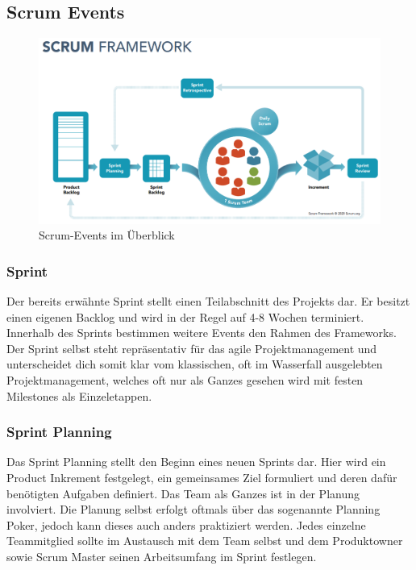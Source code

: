 \subsection{Scrum Events}
\begin{figure}[!htb]
  \centering
  \includegraphics[width=1\textwidth]{figures/daniel/Bild-2.png}
  \caption[]{Scrum-Events im Überblick}
  \label{fig:scrum_events}
\end{figure}

\subsubsection{Sprint}
Der bereits erwähnte Sprint stellt einen Teilabschnitt des Projekts dar. Er besitzt einen eigenen Backlog und wird in der Regel auf 4-8 Wochen terminiert. Innerhalb des Sprints bestimmen weitere Events den Rahmen des Frameworks. Der Sprint selbst steht repräsentativ für das agile Projektmanagement und unterscheidet dich somit klar vom klassischen, oft im Wasserfall ausgelebten Projektmanagement, welches oft nur als Ganzes gesehen wird mit festen Milestones als Einzeletappen.

\subsubsection{Sprint Planning}
Das Sprint Planning stellt den Beginn eines neuen Sprints dar. Hier wird ein Product Inkrement festgelegt, ein gemeinsames Ziel formuliert und deren dafür benötigten Aufgaben definiert. Das Team als Ganzes ist in der Planung involviert. Die Planung selbst erfolgt oftmals über das sogenannte Planning Poker, jedoch kann dieses auch anders praktiziert werden. Jedes einzelne Teammitglied sollte im Austausch mit dem Team selbst und dem Produktowner sowie Scrum Master seinen Arbeitsumfang im Sprint festlegen.



